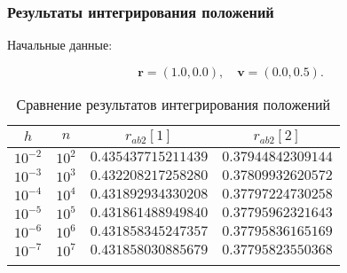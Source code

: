 \begin{frame}
\frametitle{Результаты интегрирования положений}

Начальные данные:

\su
\begin{equation}
  \mathbf{r} = (1.0, 0.0), \quad \mathbf{v} = (0.0, 0.5).
\end{equation}

\begin{table}[h]
  \centering
  \caption{Сравнение результатов интегрирования положений}
  \begin{tabular}{cccc}
    \toprule
    $ h $ &
    $ n $ &
    $ r_{ab2}[1] $ &
    $ r_{ab2}[2] $ \\
    \midrule
    $ 10^{-2} $ & $ 10^2 $ & $ 0.435437715211439 $ & $ 0.37944842309144 $ \\
    \arrayrulecolor{black!40}
    \midrule
    $ 10^{-3} $ & $ 10^3 $ & $ 0.432208217258280 $ & $ 0.37809932620572 $ \\
    \midrule
    $ 10^{-4} $ & $ 10^4 $ & $ 0.431892934330208 $ & $ 0.37797224730258 $ \\
    \midrule
    $ 10^{-5} $ & $ 10^5 $ & $ 0.431861488949840 $ & $ 0.37795962321643 $ \\
    \midrule
    $ 10^{-6} $ & $ 10^6 $ & $ 0.431858345247357 $ & $ 0.37795836165169 $ \\
    \midrule
    $ 10^{-7} $ & $ 10^7 $ & $ 0.431858030885679 $ & $ 0.37795823550368 $ \\
    \arrayrulecolor{black}
    \bottomrule
  \end{tabular}
\end{table}

\end{frame}

